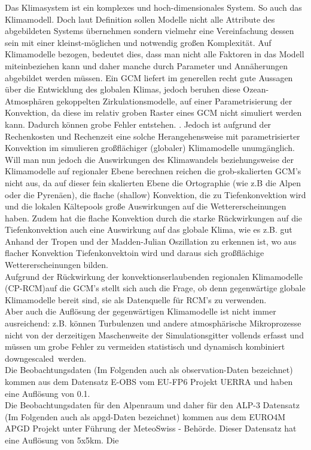 Das Klimasystem ist ein komplexes und hoch-dimensionales System. So auch das Klimamodell. Doch laut Definition \cite[vgl.][]{stachowiak} sollen Modelle nicht alle Attribute des abgebildeten Systems übernehmen sondern vielmehr eine Vereinfachung dessen sein mit einer kleinst-möglichen und notwendig großen Komplexität. Auf Klimamodelle bezogen, bedeutet dies, dass man nicht alle Faktoren in das Modell miteinbeziehen kann und daher manche durch Parameter und Annäherungen abgebildet werden müssen. Ein GCM liefert im generellen recht gute Aussagen über die Entwicklung des globalen Klimas, jedoch beruhen diese Ozean-Atmosphären gekoppelten Zirkulationsmodelle, auf einer Parametrisierung der Konvektion, da diese im relativ groben Raster eines GCM nicht simuliert werden kann. Dadurch können grobe Fehler entstehen. \cite[vgl.][Stevens \& Bony]{stevensbony}. Jedoch ist aufgrund der Rechenkosten und Rechenzeit eine solche Herangehensweise mit parametrisierter Konvektion im simulieren großflächiger (globaler) Klimamodelle  unumgänglich.\\
Will man nun jedoch die Auswirkungen des Klimawandels beziehungsweise der Klimamodelle auf regionaler Ebene berechnen reichen die grob-skalierten GCM's nicht aus, da auf dieser fein skalierten Ebene die Ortographie (wie z.B die Alpen oder die Pyrenäen), die flache (shallow) Konvektion, die zu Tiefenkonvektion wird und die lokalen Kältepools große Auswirkungen auf die Wettererscheinungen haben. Zudem hat die flache Konvektion durch die starke Rückwirkungen auf die Tiefenkonvektion auch eine Auswirkung auf das globale Klima, wie es z.B. gut Anhand der Tropen \cite[vgl.][Teixeara et al.]{teixeracardoso} und der Madden-Julian Oszillation\cite[vgl.][Chen S. et al.]{chenshuyi} zu erkennen ist, wo aus flacher Konvektion Tiefenkonvektoin wird und daraus sich großflächige Wettererscheinungen bilden.\\
Aufgrund der Rückwirkung der konvektionserlaubenden regionalen Klimamodelle (CP-RCM)auf die GCM's stellt sich auch die Frage, ob denn gegenwärtige globale Klimamodelle bereit sind, sie als Datenquelle für RCM's zu verwenden.\\
Aber auch die Auflösung der gegenwärtigen Klimamodelle ist nicht immer ausreichend: z.B. können Turbulenzen und andere atmosphärische Mikroprozesse nicht von der derzeitigen Maschenweite der Simulationsgitter vollends erfasst und müssen um grobe Fehler zu vermeiden statistisch und dynamisch kombiniert \glqq downgescaled\grqq \ werden. \cite[vgl.][Maraun et al.]{marauntowards}\\
Die Beobachtungsdaten (Im Folgenden auch als observation-Daten bezeichnet) kommen aus dem Datensatz  E-OBS vom EU-FP6 Projekt UERRA \cite{eobs} und haben eine Auflösung von 0.1\degree.\\
Die Beobachtungsdaten für den Alpenraum und daher für den ALP-3 Datensatz (Im Folgenden auch als apgd-Daten bezeichnet) kommen aus dem EURO4M APGD Projekt unter Führung der MeteoSwiss - Behörde\cite{meteoswiss}. Dieser Datensatz hat eine Auflösung von 5x5km.
Die  



